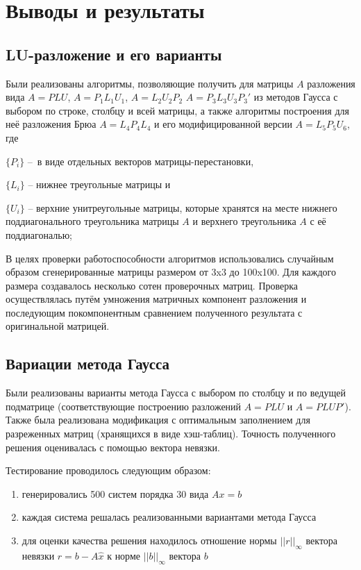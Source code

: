 \section{Выводы и результаты}
\subsection{LU-разложение и его варианты}
Были реализованы алгоритмы, позволяющие получить для матрицы $A$ разложения вида
	$A=PLU$, 
	$A=P_1 L_1 U_1$, 
	$A=L_2 U_2 P_2$
	$A=P_3 L_3 U_3 P_3'$ из методов Гаусса с выбором по строке, столбцу и всей матрицы, а также алгоритмы построения для неё разложения Брюа $A=L_4 P_4 L_4$ и его модифицированной версии $A=L_5 P_5 U_6$, 
	где 
	
	$\{P_i\}$ – в виде отдельных векторов матрицы-перестановки, 
	
	$\{L_i\}$ – нижнее треугольные матрицы и 
	
	$\{U_i\}$ – верхние унитреугольные матрицы, которые хранятся на месте нижнего поддиагонального треугольника матрицы $A$ и верхнего треугольника $A$ с её поддиагональю;

В целях проверки работоспособности алгоритмов использовались случайным образом сгенерированные матрицы размером от 3x3 до 100x100. Для каждого размера создавалось несколько сотен проверочных матриц.  Проверка осуществлялась путём умножения матричных компонент разложения и последующим покомпонентным сравнением полученного результата с оригинальной матрицей. 

\subsection{Вариации метода Гаусса}
Были реализованы варианты метода Гаусса с выбором по столбцу и по ведущей подматрице (соответствующие построению разложений $A=PLU$ и $A=PLUP'$). Также была реализована модификация с оптимальным заполнением для разреженных матриц (хранящихся в виде хэш-таблиц). Точность полученного решения оценивалась с помощью вектора невязки.

Тестирование проводилось следующим образом:
\begin{enumerate}
	\item генерировались 500 систем порядка 30 вида $Ax=b$
	\item каждая система решалась реализованными вариантами метода Гаусса
	\item для оценки качества решения находилось отношение нормы $||r||_{\infty}$ вектора невязки $r=b-A\hat{x}$ к норме $||b||_{\infty}$ вектора $b$
\end{enumerate}

